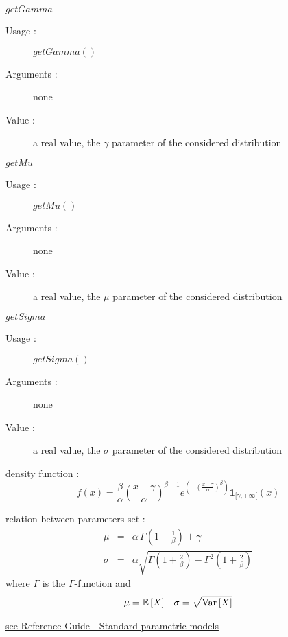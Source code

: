 \begin{description}
\begin{description}
  \item $getGamma$
    \begin{description}
    \item[Usage :] $getGamma()$
    \item[Arguments :] none
    \item[Value :]  a real value, the $\gamma$ parameter of the considered distribution
    \end{description}
    \bigskip

  \item $getMu$
    \begin{description}
    \item[Usage :] $getMu()$
    \item[Arguments :] none
    \item[Value :]  a real value,  the $\mu$ parameter of the considered distribution
    \end{description}
    \bigskip
  \item $getSigma$
    \begin{description}
    \item[Usage :] $getSigma()$
    \item[Arguments :] none
    \item[Value :]  a real value,  the $\sigma$ parameter of the considered distribution
    \end{description}
    \bigskip
  \end{description}

\item[Details :]  \rule{0pt}{1em}
  \begin{description}
  \item density function :
    $$
    f(x) =
    \frac{\beta}{\alpha}
    \left(
      \frac{x-\gamma}{\alpha}
    \right)^{\beta-1}
    e^{
      \left(
        - \left(
          \frac{x-\gamma}{\alpha}
        \right)^{\beta}
      \right)}
    \boldsymbol{1}_{[\gamma,+\infty[}(x)
    $$


  \item relation between parameters set :
    \begin{eqnarray*}
      \mu                       &       =       & \alpha \,\Gamma\left(1+\frac{1}{\beta}\right) + \gamma        \\
      \sigma            &  =    &        \alpha \sqrt{\Gamma\left(1+\frac{2}{\beta}\right) -  \Gamma^2 \left(1+\frac{2}{\beta}\right)}
    \end{eqnarray*}
    where $\Gamma$ is the $\Gamma$-function and
    \begin{align*}
      \mu = {\mathbb E}\left[ X \right]
      &&
      \sigma = \sqrt{{\rm Var}\left[ X \right] }
    \end{align*}
  \end{description}

\item[Links :]  \rule{0pt}{1em}
  \href{OpenTURNS_ReferenceGuide.pdf}{see Reference Guide - Standard parametric models}
\end{description}

